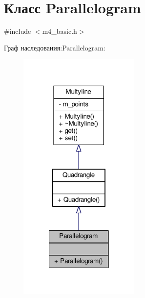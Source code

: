 \hypertarget{class_parallelogram}{\section{Класс Parallelogram}
\label{class_parallelogram}
}


{\ttfamily \#include $<$m4\-\_\-basic.\-h$>$}



Граф наследования\-:Parallelogram\-:
\nopagebreak
\begin{figure}[H]
\begin{center}
\leavevmode
\includegraphics[width=170pt]{class_parallelogram__inherit__graph}
\end{center}
\end{figure}


